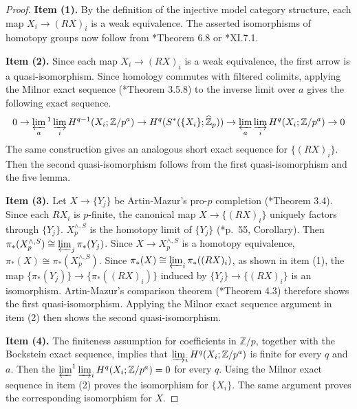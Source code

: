 \documentclass[11pt]{amsart}
\theoremstyle{definition}
\numberwithin{equation}{section}
\numberwithin{equation}{section}
\newcommand\ZZ{\mathbb{Z}}
\begin{document}
\begin{proof}
\textbf{Item (1). } By the definition of the injective model category structure, each map $X_i\rightarrow (RX)_i$ is a weak equivalence. The asserted isomorphisms of homotopy groups now follow from \cite{Friedlander-etale-homotopy}*{Theorem 6.8} or \cite{Bousfield-Kan-homotopy-limits-completions-localizations}*{XI.7.1}.

\textbf{Item (2). } Since each map $X_i\rightarrow (RX)_i$ is a weak equivalence, the first arrow is a quasi-isomorphism. Since homology commutes with filtered colimits, applying the Milnor exact sequence (\cite{Weibel-homological-algebra}*{Theorem 3.5.8}) to the inverse limit over $a$ gives the following exact sequence.
\[
0\rightarrow \varprojlim_{a}{}^1 \varinjlim_i H^{q-1}(X_i;\ZZ/p^a) \rightarrow H^q(S^*(\{X_i\};\widehat{\ZZ}_p)) \rightarrow \varprojlim_{a} \varinjlim_i H^{q}(X_i;\ZZ/p^a) \rightarrow 0
\]
The same construction gives an analogous short exact sequence for $\{(RX)_i\}$. Then the second quasi-isomorphism follows from the first quasi-isomorphism and the five lemma.

\textbf{Item (3). } Let $X\rightarrow \{Y_j\}$ be Artin-Mazur's pro-$p$ completion (\cite{Artin-Mazur-etale-homotopy}*{Theorem 3.4}). Since each $RX_i$ is $p$-finite, the canonical map $X\rightarrow \{(RX)_i\}$ uniquely factors through $\{Y_j\}$. $X^{\wedge,S}_p$ is the homotopy limit of $\{Y_j\}$ (\cite{Sullivan-MIT-notes}*{p.~55, Corollary}). Then $\pi_*(X^{\wedge,S}_p)\cong \varprojlim_j \pi_*(Y_j)$. Since $X\rightarrow X^{\wedge,S}_p$ is a homotopy equivalence, $\pi_*(X)\cong\pi_*(X^{\wedge,S}_p)$. Since $\pi_*(X)\cong\varprojlim_i \pi_*((RX)_i)$, as shown in item (1), the map $\{\pi_*(Y_j)\}\rightarrow \{\pi_*((RX)_i)\}$ induced by $\{Y_j\}\rightarrow \{(RX)_i\}$ is an isomorphism. Artin-Mazur's comparison theorem (\cite{Artin-Mazur-etale-homotopy}*{Theorem 4.3}) therefore shows the first quasi-isomorphism. Applying the Milnor exact sequence argument in item (2) then shows the second quasi-isomorphism.

\textbf{Item (4). } 
The finiteness assumption for coefficients in $\ZZ/p$, together with the Bockstein exact sequence, implies that $\varinjlim_i H^q(X_i;\ZZ/p^a)$ is finite for every $q$ and $a$. Then the $\varprojlim^1\varinjlim_i H^q(X_i;\ZZ/p^a)=0$ for every $q$. Using the Milnor exact sequence in item (2) proves the isomorphism for $\{X_i\}$. The same argument proves the corresponding isomorphism for $X$.
\end{proof}
\end{document}
